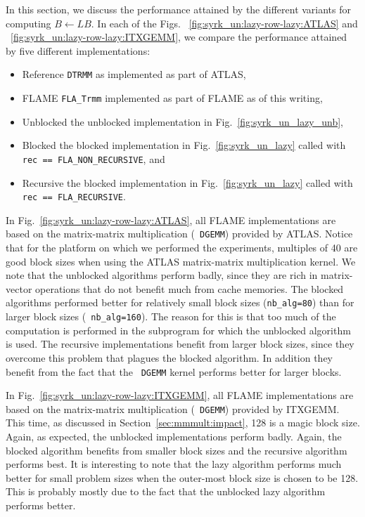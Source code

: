 In this section, we discuss the performance attained by the different
variants for computing $ B \leftarrow L B $.  In each of the Figs.
~\ref{fig:syrk_un:lazy-row-lazy:ATLAS} and
~\ref{fig:syrk_un:lazy-row-lazy:ITXGEMM}, we compare the performance
attained by five different implementations:
\begin{itemize}
\item{Reference}
{\tt DTRMM} as implemented as part of ATLAS,
\item{FLAME}
{\tt FLA\_Trmm} implemented as part of FLAME
as of this writing,
\item{Unblocked}
the unblocked implementation in Fig.~\ref{fig:syrk_un_lazy_unb},
\item{Blocked}
the blocked implementation in Fig.~\ref{fig:syrk_un_lazy}
called with 
{\tt rec == 
%
FLA\_NON\_RECURSIVE}, and
\item{Recursive}
the blocked implementation in Fig.~\ref{fig:syrk_un_lazy}
called with 
{\tt rec == 
%
FLA\_RECURSIVE}.
\end{itemize}
In Fig.~\ref{fig:syrk_un:lazy-row-lazy:ATLAS}, all FLAME
implementations are based on the matrix-matrix multiplication ({\tt
DGEMM}) provided by ATLAS.  Notice that for the platform on which we
performed the experiments, multiples of 40 are good block sizes when
using the ATLAS matrix-matrix multiplication kernel.  We note that the
unblocked algorithms perform badly, since they are rich in
matrix-vector operations that do not benefit much from cache memories.
The blocked algorithms performed better for relatively small block
sizes ({\tt nb\_alg=80}) than for larger block sizes ({\tt
nb\_alg=160}).  The reason for this is that too much of the
computation is performed in the subprogram for which the unblocked
algorithm is used.  The recursive implementations benefit from larger
block sizes, since they overcome this problem that plagues the blocked
algorithm.  In addition they benefit from the fact that the {\tt
DGEMM} kernel performs better for larger blocks.

In Fig.~\ref{fig:syrk_un:lazy-row-lazy:ITXGEMM}, all FLAME
implementations are based on the matrix-matrix multiplication ({\tt
DGEMM}) provided by ITXGEMM.  This time, as discussed in
Section~\ref{sec:mmmult:impact}, 128 is a magic block size.  Again, as
expected, the unblocked implementations perform badly.  Again, the
blocked algorithm benefits from smaller block sizes and the recursive
algorithm performs best.  It is interesting to note that the lazy
algorithm performs much better for small problem sizes when the
outer-most block size is chosen to be 128.  This is probably mostly
due to the fact that the unblocked lazy algorithm performs better.

